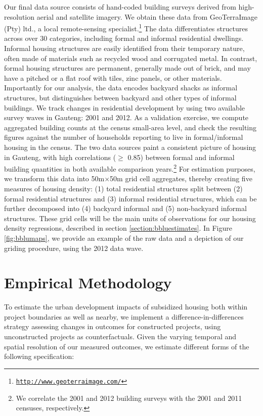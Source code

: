 \documentclass[12pt]{article}
\begin{document}
Our final data source consists of hand-coded building surveys derived from high-resolution aerial and satellite imagery. We obtain these data from GeoTerraImage (Pty) ltd., a local remote-sensing specialist.\footnote{\href{http://www.geoterraimage.com/}{\tt http://www.geoterraimage.com/}} The data differentiates structures across over 30 categories, including formal and informal residential dwellings. Informal housing structures are easily identified from their temporary nature, often made of materials such as recycled wood and corrugated metal. In contrast, formal housing structures are permanent, generally made out of brick, and may have a pitched or a flat roof with tiles, zinc panels, or other materials. Importantly for our analysis, the data encodes backyard shacks as informal structures, but distinguishes between backyard and other types of informal buildings. We track changes in residential development by using two available survey waves in Gauteng: 2001 and 2012. As a validation exercise, we compute aggregated building counts at the census small-area level, and check the resulting figures against the number of households reporting to live in formal/informal housing in the census. The two data sources paint a consistent picture of housing in Gauteng, with high correlations ($\geq$ 0.85) between formal and informal building quantities in both available comparison years.\footnote{We correlate the 2001 and 2012 building surveys with the 2001 and 2011 censuses, respectively.} For estimation purposes, we transform this data into 50m$\times$50m grid cell aggregates, thereby creating five measures of housing density: (1) total residential structures split between (2) formal residential structures and (3) informal residential structures, which can be further decomposed into (4) backyard informal and (5) non-backyard informal structures.  These grid cells will be the main units of observations for our housing density regressions, described in section \ref{section:bbluestimates}. In Figure \ref{fig:bblumaps}, we provide an example of the raw data and a depiction of our griding procedure, using the 2012 data wave.

\section{Empirical Methodology}\label{section:methodology}

To estimate the urban development impacts of subsidized housing both within project boundaries as well as nearby, we implement a difference-in-differences strategy assessing changes in outcomes for constructed projects, using unconstructed projects as counterfactuals. Given the varying temporal and spatial resolution of our measured outcomes, we estimate different forms of the following specification:
\end{document}
